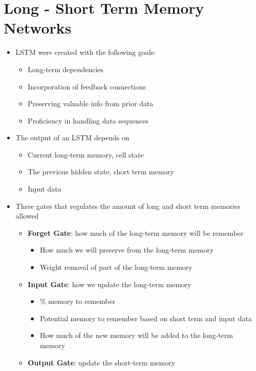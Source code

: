 \section{Long - Short Term Memory Networks}
\begin{itemize}
    \item LSTM were created with the following goals:
    \begin{itemize}
        \item Long-term dependencies
        \item Incorporation of feedback connections
        \item Preserving valuable info from prior data
        \item Proficiency in handling data sequences
    \end{itemize}
    \item The output of an LSTM depends on
    \begin{itemize}
        \item Current long-term memory, cell state
        \item The previous hidden state, short term memory
        \item Input data
    \end{itemize}
    \item Three gates that regulates the amount of long and short term memories allowed
    \begin{itemize}
        \item \textbf{Forget Gate}: how much of the long-term memory will be remember
        \begin{itemize}
            \item How much we will preserve from the long-term memory
            \item Weight removal of part of the long-term memory
        \end{itemize}
        \item \textbf{Input Gate}: how we update the long-term memory
        \begin{itemize}
            \item \% memory to remember
            \item Potential memory to remember based on short term and input data
            \item How much of the new memory will be added to the long-term memory 
        \end{itemize}
        \item \textbf{Output Gate}: update the short-term memory

\end{itemize}
\end{itemize}
